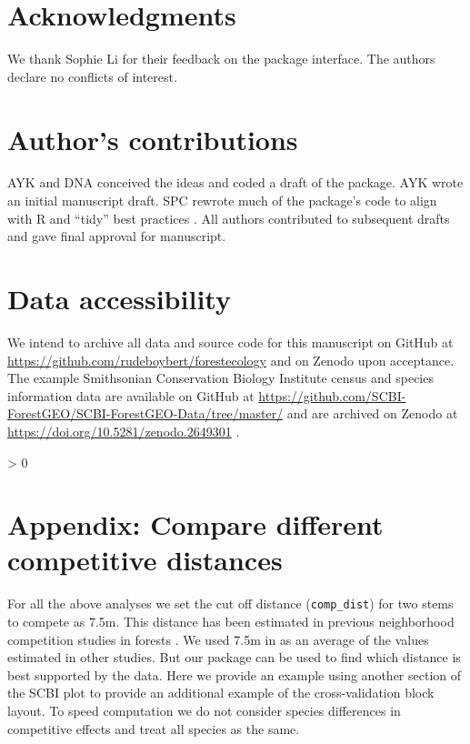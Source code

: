 \documentclass[12pt]{article}
\newlength{\cslhangindent}
\newenvironment{CSLReferences}[2] %
 {%
  \setlength{\parindent}{0pt}
  \ifodd #1 \everypar{\setlength{\hangindent}{\cslhangindent}}\ignorespaces\fi
  \ifnum #2 > 0
  \setlength{\parskip}{#2\baselineskip}
  \fi
 }%
 {}
\begin{document}
\hypertarget{acknowledgments}{%
\section{Acknowledgments}\label{acknowledgments}}

We thank Sophie Li for their feedback on the package interface. The
authors declare no conflicts of interest.

\hypertarget{authors-contributions}{%
\section{Author's contributions}\label{authors-contributions}}

AYK and DNA conceived the ideas and coded a draft of the package. AYK
wrote an initial manuscript draft. SPC rewrote much of the package's
code to align with R and ``tidy'' best practices
\citep{wickham_welcome_2019}. All authors contributed to subsequent
drafts and gave final approval for manuscript.

\hypertarget{data-accessibility}{%
\section{Data accessibility}\label{data-accessibility}}

We intend to archive all data and source code for this manuscript on
GitHub at \url{https://github.com/rudeboybert/forestecology} and on
Zenodo upon acceptance. The example Smithsonian Conservation Biology
Institute census and species information data are available on GitHub at
\url{https://github.com/SCBI-ForestGEO/SCBI-ForestGEO-Data/tree/master/}
and are archived on Zenodo at
\url{https://doi.org/10.5281/zenodo.2649301}
\citep{gonzalez-akre_scbi-forestgeoscbi-forestgeo-data_2020}.

\hypertarget{refs}{}
\begin{CSLReferences}{0}{0}
\end{CSLReferences}

\appendix

\hypertarget{mult-dist}{%
\section{Appendix: Compare different competitive
distances}\label{mult-dist}}

For all the above analyses we set the cut off distance
(\texttt{comp\_dist}) for two stems to compete as 7.5m. This distance
has been estimated in previous neighborhood competition studies in
forests \citep[\citet{uriarte_spatially_2004},
\citet{canham_neighborhood_2006}]{canham_neighborhood_2004}. We used
7.5m in \citet{allen_permutation_2020} as an average of the values
estimated in other studies. But our package can be used to find which
distance is best supported by the data. Here we provide an example using
another section of the SCBI plot to provide an additional example of the
cross-validation block layout. To speed computation we do not consider
species differences in competitive effects and treat all species as the
same.
\end{document}
